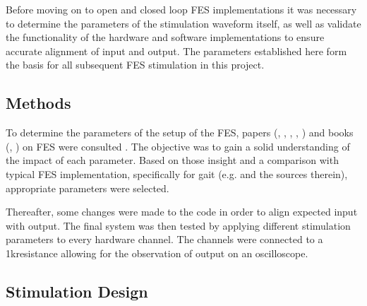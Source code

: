 
Before moving on to open and closed loop FES implementations it was necessary to determine the parameters of the stimulation waveform itself, as well as validate the functionality of the hardware and software implementations to ensure accurate alignment of input and output. The parameters established here form the basis for all subsequent FES stimulation in this project.

\subsection{Methods}
To determine the parameters of the setup of the FES, papers (\cite{peckham_functional_2005}, \cite{lynch_functional_2008}, \cite{marquez-chin_functional_2020}, \cite{bigland-ritchie_muscle_2000}, \cite{vrontos_electrical_2024}) and books (\cite{wood_chapter_2020}, \cite{rupp_functional_2021}) on FES were consulted  . The objective was to gain a solid understanding of the impact of each parameter. Based on those insight and a comparison with typical FES implementation, specifically for gait (e.g. \cite{aout_effects_2023} and the sources therein), appropriate parameters were selected. 

Thereafter, some changes were made to the code in order to align expected input with output. The final system was then tested by applying different stimulation parameters to every hardware channel. The channels were connected to a 1k\ohm resistance allowing for the observation of output on an oscilloscope. 

\subsection{Stimulation Design}
